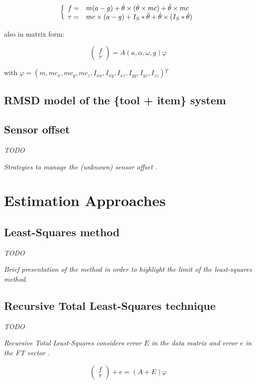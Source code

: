 \documentclass[/home/francois/latex/report/main.tex]{subfiles}
\begin{document}
\begin{equation}
 \label{dim_1}
 \left \{
 \begin{array}{l l}
  f =    & m (a - g) + \dot{\theta} \times (\dot{\theta} \times m c) + \ddot{\theta} \times m c \\
  \tau = & m c \times (a - g)
  + I_{S} \ast \ddot{\theta} + \dot{\theta} \times (I_{S} \ast \dot{\theta})
 \end{array}
 \right.
\end{equation}

also in matrix form:

\begin{equation}
 \begin{pmatrix}
  f    \\
  \tau
 \end{pmatrix}
 = A(a, \alpha, \omega, g) \varphi
\end{equation}

with $\varphi = (m, m c_x, m c_y, m c_z, I_{xx}, I_{xy}, I_{xz}, I_{yy}, I_{yz}, I_{zz}) {}^T$

\subsection{\ac{RMSD} model of the \{tool + item\} system}


\subsection{Sensor offset}

\textit{TODO}

{\it
Strategies to manage the (unknown) sensor offset \cite{Kubus2007, Kubus2008}.
}

\section{Estimation Approaches}

\subsection{Least-Squares method}

\textit{TODO}

{\it
Brief presentation of the method in order to highlight the limit of the least-squares method.
}

\subsection{Recursive Total Least-Squares technique}

\textit{TODO}

{\it
Recursive Total Least-Squares considers error $E$ in the data matrix and error $e$ in the \ac{FT} vector \cite{Kubus2008}
.

\begin{equation}
 \begin{pmatrix}
  f    \\
  \tau
 \end{pmatrix} + e
 = (A + E) \varphi
\end{equation}
}
\end{document}
